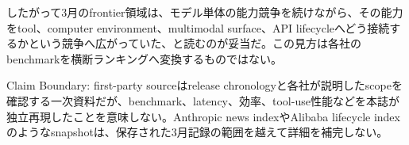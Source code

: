 したがって3月のfrontier領域は、モデル単体の能力競争を続けながら、その能力をtool、computer environment、multimodal surface、API lifecycleへどう接続するかという競争へ広がっていた、と読むのが妥当だ。この見方は各社のbenchmarkを横断ランキングへ変換するものではない。\autocite{src-a24fd97eb3d0,src-eea6230f612a,src-f6aa679babd7}


\begin{claimboundary}
Claim Boundary: first-party sourceはrelease chronologyと各社が説明したscopeを確認する一次資料だが、benchmark、latency、効率、tool-use性能などを本誌が独立再現したことを意味しない。Anthropic news indexやAlibaba lifecycle indexのようなsnapshotは、保存された3月記録の範囲を越えて詳細を補完しない。\autocite{src-46b3e364b737,src-8afdb503cc56,src-9156c37fb1c2,src-a24fd97eb3d0,src-eac8dfbeb78c,src-eea6230f612a,src-f6aa679babd7}
\end{claimboundary}
